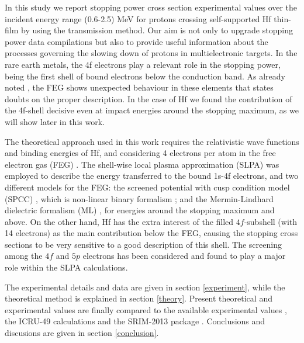 \documentclass[aps,prb,reprint,groupedaddress]{revtex4-1}
\begin{document}
In this study we report stopping power cross section experimental values over the incident energy range (0.6-2.5) MeV for protons crossing self-supported Hf thin-film by using the transmission method. Our aim is not only to upgrade stopping power data compilations \cite{HPaul03,mondim17} but also to provide useful information about the processes governing the slowing down of protons in multielectronic targets. In the rare earth metals, the 4f electrons play a relevant role in the stopping power, being the first shell of bound electrons below the conduction band. As already noted \cite{Roth17}, the FEG shows unexpected %
behaviour in these elements that states doubts on the proper description. In the case of Hf we found the contribution of the 4f-shell decisive even at impact energies around the stopping maximum, as we will show later in this work.

The theoretical approach used in this work requires 
the relativistic wave functions and binding energies of Hf, and considering 4 electrons per atom in the free electron gas (FEG) \cite{mendez2019}. The shell-wise local plasma approximation (SLPA) \cite{mon13} was employed to describe the energy transferred to the bound 1s-4f electrons, and two different models for the FEG: the screened potential with cusp condition model (SPCC) \cite{mon17}, which is non-linear binary formalism%
; and the Mermin-Lindhard dielectric formalism (ML) \cite{Mermin}, for energies around the stopping maximum and above.  On the other hand, Hf has the extra interest of the filled $4f$-subshell (with 14 electrons) as the main contribution below the FEG, causing the stopping cross sections to be very sensitive to a good description of this shell. The screening among the $4f$ and $5p$ electrons has been considered and found to play a major role within the SLPA calculations.

The experimental details and data are given in section \ref{experiment}, while the theoretical method is explained in section \ref{theory}. Present theoretical and experimental values are finally compared to the available experimental values \cite{Sirotinin},  the ICRU-49 calculations \cite{ICRU49} and the SRIM-2013 package \cite{Ziegler01}. Conclusions and discusions are given in section \ref{conclusion}.



\end{document}
